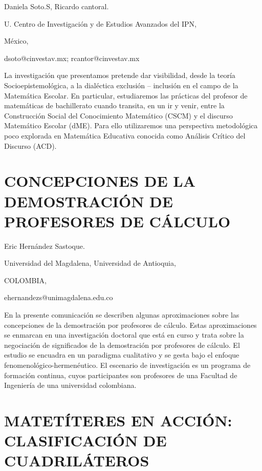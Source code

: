 \begin{datos}

Daniela Soto.S, Ricardo cantoral.

U. Centro de Investigación y de Estudios Avanzados del IPN,

México,

dsoto@cinvestav.mx; rcantor@cinvestav.mx

\end{datos}

La investigación que presentamos pretende dar visibilidad, desde la
teoría Socioepistemológica, a la dialéctica exclusión – inclusión
en el campo de la Matemática Escolar. En particular, estudiaremos
las prácticas del profesor de matemáticas de bachillerato cuando transita,
en un ir y venir, entre la Construcción Social del Conocimiento Matemático
(CSCM) y el discurso Matemático Escolar (dME). Para ello utilizaremos
una perspectiva metodológica poco explorada en Matemática Educativa
conocida como Análisis Crítico del Discurso (ACD).


\section{CONCEPCIONES DE LA DEMOSTRACIÓN DE PROFESORES DE CÁLCULO}

\begin{datos}

Eric Hernández Sastoque.

Universidad del Magdalena, Universidad de Antioquia,

COLOMBIA,

ehernandezs@unimagdalena.edu.co 

\end{datos}

En la presente comunicación se describen algunas aproximaciones sobre
las concepciones de la demostración por profesores de cálculo. Estas
aproximaciones se enmarcan en una investigación doctoral que está
en curso y trata sobre la negociación de significados de la demostración
por profesores de cálculo. El estudio se encuadra en un paradigma
cualitativo y se gesta bajo el enfoque fenomenológico-hermenéutico.
El escenario de investigación es un programa de formación continua,
cuyos participantes son profesores de una Facultad de Ingeniería de
una universidad colombiana. 


\section{MATETÍTERES EN ACCIÓN: CLASIFICACIÓN DE CUADRILÁTEROS}

